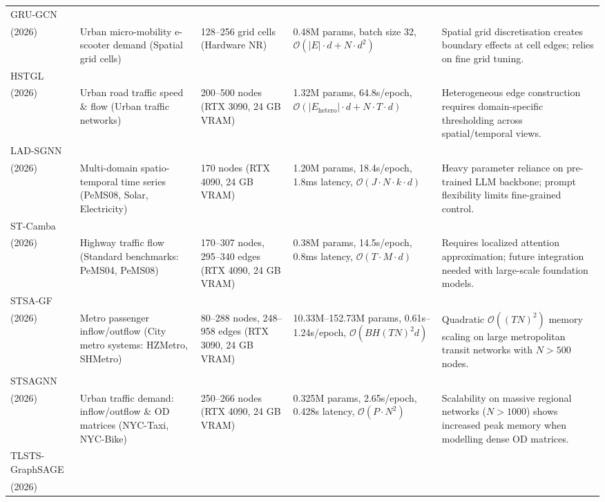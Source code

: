 \begin{longtable}{p{1.5cm} p{2.25cm} p{2.25cm} p{2.25cm} p{2.25cm}}
\hline
GRU-GCN\\(2026) ~\cite{mayme2025hybrid} &
Urban micro-mobility e-scooter demand (Spatial grid cells) &
128--256 grid cells (Hardware NR) &
0.48M params, batch size 32, $\mathcal{O}(|E| \cdot d + N \cdot d^2)$ &
Spatial grid discretisation creates boundary effects at cell edges; relies on fine grid tuning. \\
\hline
HSTGL\\(2026) ~\cite{sun2026integrating} &
Urban road traffic speed \& flow (Urban traffic networks) &
200--500 nodes (RTX 3090, 24 GB VRAM) &
1.32M params, 64.8s/epoch, $\mathcal{O}(|E_{\text{hetero}}| \cdot d + N \cdot T \cdot d)$ &
Heterogeneous edge construction requires domain-specific thresholding across spatial/temporal views. \\
\hline
LAD-SGNN\\(2026) ~\cite{zheng2026llm} &
Multi-domain spatio-temporal time series (PeMS08, Solar, Electricity) &
170 nodes (RTX 4090, 24 GB VRAM) &
1.20M params, 18.4s/epoch, 1.8ms latency, $\mathcal{O}(J \cdot N \cdot k \cdot d)$ &
Heavy parameter reliance on pre-trained LLM backbone; prompt flexibility limits fine-grained control. \\
\hline
\pagebreak[4]
ST-Camba\\(2026) ~\cite{wang2026st} &
Highway traffic flow (Standard benchmarks: PeMS04, PeMS08) &
170--307 nodes, 295--340 edges (RTX 4090, 24 GB VRAM) &
0.38M params, 14.5s/epoch, 0.8ms latency, $\mathcal{O}(T \cdot M \cdot d)$ &
Requires localized attention approximation; future integration needed with large-scale foundation models. \\
\hline
STSA-GF\\(2026) ~\cite{yang2026short} &
Metro passenger inflow/outflow (City metro systems: HZMetro, SHMetro) &
80--288 nodes, 248--958 edges (RTX 3090, 24 GB VRAM) &
10.33M--152.73M params, 0.61s--1.24s/epoch, $\mathcal{O}(B H (TN)^2 d)$ &
Quadratic $\mathcal{O}((TN)^2)$ memory scaling on large metropolitan transit networks with $N > 500$ nodes. \\
\hline
STSAGNN\\(2026) ~\cite{liu2026spatio} &
Urban traffic demand: inflow/outflow \& OD matrices (NYC-Taxi, NYC-Bike) &
250--266 nodes (RTX 4090, 24 GB VRAM) &
0.325M params, 2.65s/epoch, 0.428s latency, $\mathcal{O}(P \cdot N^2)$ &
Scalability on massive regional networks ($N > 1000$) shows increased peak memory when modelling dense OD matrices. \\
\hline
TLSTS-GraphSAGE\\(2026) ~\cite{yu2025transfer} &

\end{longtable}
